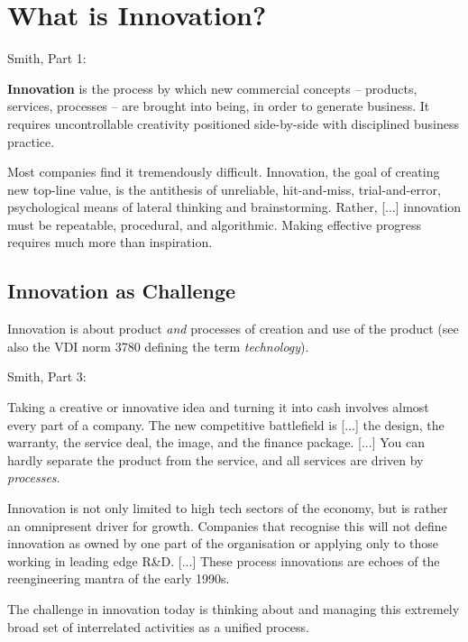 \documentclass[11pt,a4paper]{article}
\begin{document}
\section{What is Innovation?}

Smith, Part 1:

\textbf{Innovation} is the process by which new commercial concepts –
products, services, processes – are brought into being, in order to generate
business. It requires uncontrollable creativity positioned side-by-side with
disciplined business practice.

Most companies find it tremendously difficult. Innovation, the goal of
creating new top-line value, is the antithesis of unreliable, hit-and-miss,
trial-and-error, psychological means of lateral thinking and brainstorming.
Rather, [...] innovation must be repeatable, procedural, and algorithmic.
Making effective progress requires much more than inspiration.

\subsection{Innovation as Challenge}
Innovation is about product \emph{and} processes of creation and use of the
product (see also the VDI norm 3780 defining the term \emph{technology}).

Smith, Part 3:

Taking a creative or innovative idea and turning it into cash involves almost
every part of a company. The new competitive battlefield is [...] the design,
the warranty, the service deal, the image, and the finance package.  [...] You
can hardly separate the product from the service, and all services are driven
by \emph{processes}.
  
Innovation is not only limited to high tech sectors of the economy, but is
rather an omnipresent driver for growth. Companies that recognise this will
not define innovation as owned by one part of the organisation or applying
only to those working in leading edge R\&D.  [...] These process innovations
are echoes of the reengineering mantra of the early 1990s.

The challenge in innovation today is thinking about and managing this
extremely broad set of interrelated activities as a unified process.
\end{document}
